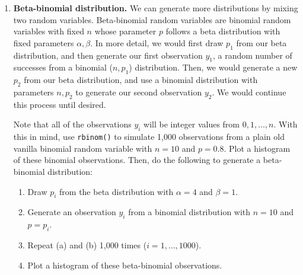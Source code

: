 \documentclass[
]{krantz}
\providecommand{\tightlist}{%
  \setlength{\itemsep}{0pt}\setlength{\parskip}{0pt}}
\begin{document}
\begin{enumerate}
\def\labelenumi{\arabic{enumi}.}
\item
  \textbf{Beta-binomial distribution.} We can generate more distributions by mixing two random variables.  Beta-binomial random variables are binomial random variables with fixed \(n\) whose parameter \(p\) follows a beta distribution with fixed parameters \(\alpha, \beta\). In more detail, we would first draw \(p_1\) from our beta distribution, and then generate our first observation \(y_1\), a random number of successes from a binomial (\(n, p_1\)) distribution. Then, we would generate a new \(p_2\) from our beta distribution, and use a binomial distribution with parameters \(n, p_2\) to generate our second observation \(y_2\). We would continue this process until desired.

  Note that all of the observations \(y_i\) will be integer values from \(0, 1, \ldots, n\). With this in mind, use \texttt{rbinom()} to simulate 1,000 observations from a plain old vanilla binomial random variable with \(n=10\) and \(p=0.8\). Plot a histogram of these binomial observations. Then, do the following to generate a beta-binomial distribution:

  \begin{enumerate}
  \def\labelenumii{\alph{enumii}.}
  \tightlist
  \item
    Draw \(p_i\) from the beta distribution with \(\alpha=4\) and \(\beta=1\).
  \item
    Generate an observation \(y_i\) from a binomial distribution with \(n=10\) and \(p = p_i\).
  \item
    Repeat (a) and (b) 1,000 times (\(i=1,\ldots,1000\)).
  \item
    Plot a histogram of these beta-binomial observations.
  \end{enumerate}


\end{enumerate}
\end{document}

